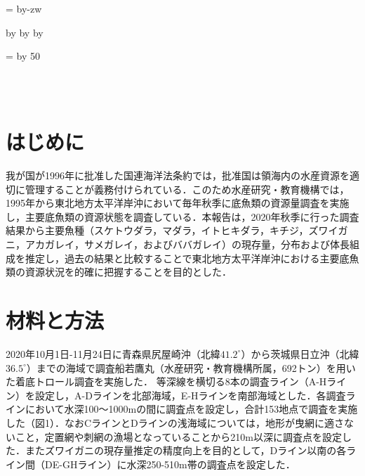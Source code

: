 \documentclass[11pt]{article} %
\makeatletter
\def\mojiparline#1{
\newcounter{mpl}
\setcounter{mpl}{#1}
\@tempdima=\linewidth
\advance\@tempdima by-\value{mpl}zw
\addtocounter{mpl}{-1}
\divide\@tempdima by \value{mpl}
\advance\kanjiskip by\@tempdima
\advance\parindent by\@tempdima
}
\def\linesparpage#1{
\baselineskip=\textheight
\divide\baselineskip by #1
}
\makeatother
\begin{document}

\mojiparline{40} %
\linesparpage{50} %

\begin{linenumbers}
\\
\\


\section{はじめに}
我が国が1996年に批准した国連海洋法条約では，批准国は領海内の水産資源を適切に管理することが義務付けられている．このため水産研究・教育機構では，1995年から東北地方太平洋岸沖において毎年秋季に底魚類の資源量調査を実施し，主要底魚類の資源状態を調査している．本報告は，2020年秋季に行った調査結果から主要魚種（スケトウダラ，マダラ，イトヒキダラ，キチジ，ズワイガニ，アカガレイ，サメガレイ，およびババガレイ）の現存量，分布および体長組成を推定し，過去の結果と比較することで東北地方太平洋岸沖における主要底魚類の資源状況を的確に把握することを目的とした．

\section{材料と方法}
2020年10月1日-11月24日に青森県尻屋崎沖（北緯$\textrm{41.2}^\circ$）から茨城県日立沖（北緯$\textrm{36.5}^\circ$）までの海域で調査船若鷹丸（水産研究・教育機構所属，692トン）を用いた着底トロール調査を実施した．
等深線を横切る8本の調査ライン（A-Hライン）を設定し，A-Dラインを北部海域，E-Hラインを南部海域とした．各調査ラインにおいて水深100～1000mの間に調査点を設定し，合計153地点で調査を実施した（図1）．なおCラインとDラインの浅海域については，地形が曳網に適さないこと，定置網や刺網の漁場となっていることから210m以深に調査点を設定した．またズワイガニの現存量推定の精度向上を目的として，Dライン以南の各ライン間（DE-GHライン）に水深250-510m帯の調査点を設定した．


\end{linenumbers}
\end{document}
